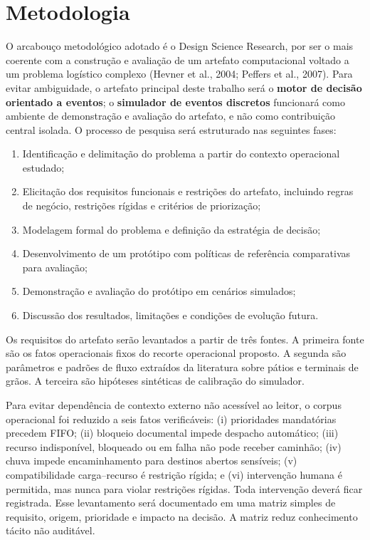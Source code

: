 \documentclass[
  12pt,
  oneside,
  a4paper,
  sumario=tradicional,
  brazil
]{abntex2}
\begin{document}
\chapter{Metodologia}
O arcabou\c{c}o metodol\'ogico adotado \'e o Design Science Research, por ser o mais coerente com a constru\c{c}\~ao e avalia\c{c}\~ao de um artefato computacional voltado a um problema log\'istico complexo (Hevner et al., 2004; Peffers et al., 2007). Para evitar ambiguidade, o artefato principal deste trabalho ser\'a o \textbf{motor de decis\~ao orientado a eventos}; o \textbf{simulador de eventos discretos} funcionar\'a como ambiente de demonstra\c{c}\~ao e avalia\c{c}\~ao do artefato, e n\~ao como contribui\c{c}\~ao central isolada. O processo de pesquisa ser\'a estruturado nas seguintes fases:
\begin{enumerate}[leftmargin=1.27cm,itemsep=0pt,topsep=0pt,parsep=0pt,partopsep=0pt]
  \item Identifica\c{c}\~ao e delimita\c{c}\~ao do problema a partir do contexto operacional estudado;
  \item Elicita\c{c}\~ao dos requisitos funcionais e restri\c{c}\~oes do artefato, incluindo regras de neg\'ocio, restri\c{c}\~oes r\'igidas e crit\'erios de prioriza\c{c}\~ao;
  \item Modelagem formal do problema e defini\c{c}\~ao da estrat\'egia de decis\~ao;
  \item Desenvolvimento de um prot\'otipo com pol\'iticas de refer\^encia comparativas para avalia\c{c}\~ao;
  \item Demonstra\c{c}\~ao e avalia\c{c}\~ao do prot\'otipo em cen\'arios simulados;
  \item Discuss\~ao dos resultados, limita\c{c}\~oes e condi\c{c}\~oes de evolu\c{c}\~ao futura.
\end{enumerate}

Os requisitos do artefato ser\~ao levantados a partir de tr\^es fontes. A primeira fonte s\~ao os fatos operacionais fixos do recorte operacional proposto. A segunda s\~ao par\^ametros e padr\~oes de fluxo extra\'idos da literatura sobre p\'atios e terminais de gr\~aos. A terceira s\~ao hip\'oteses sint\'eticas de calibra\c{c}\~ao do simulador.

Para evitar depend\^encia de contexto externo n\~ao acess\'ivel ao leitor, o corpus operacional foi reduzido a seis fatos verific\'aveis: (i) prioridades mandat\'orias precedem FIFO; (ii) bloqueio documental impede despacho autom\'atico; (iii) recurso indispon\'ivel, bloqueado ou em falha n\~ao pode receber caminh\~ao; (iv) chuva impede encaminhamento para destinos abertos sens\'iveis; (v) compatibilidade carga--recurso \'e restri\c{c}\~ao r\'igida; e (vi) interven\c{c}\~ao humana \'e permitida, mas nunca para violar restri\c{c}\~oes r\'igidas. Toda interven\c{c}\~ao dever\'a ficar registrada. Esse levantamento ser\'a documentado em uma matriz simples de requisito, origem, prioridade e impacto na decis\~ao. A matriz reduz conhecimento t\'acito n\~ao audit\'avel.
\end{document}
